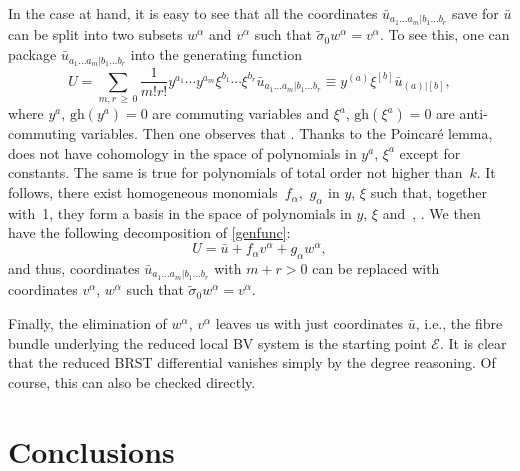 \documentclass[10pt,a4paper]{amsart}
\numberwithin{equation}{section}
\theoremstyle{definition}
\renewcommand{\tilde}{\widetilde}
\newcommand{\gh}[1]{\mathrm{gh}(#1)}
\renewcommand{\geq}{\,{\geqslant}\,}
\def\cE{\mathcal{E}}
\begin{document}
In the case at hand, it is easy to see that all the coordinates $\bar{u}_{a_1\dots a_m|b_1\dots b_r}$ save for $\bar{u}$ can be split into two subsets $w^\alpha$ and $v^\alpha$ such that $\tilde\sigma_0 w^\alpha=v^\alpha$. To see this, one can package $\bar{u}_{a_1\dots a_m|b_1\dots b_r}$ into the generating function
\begin{equation}\label{genfunc}
 U=\sum_{m,r\geq0}\frac{1}{m!r!}y^{a_1}\cdots y^{a_m}\xi^{b_1}\cdots\xi^{b_r}\bar{u}_{a_1\dots a_m|b_1\dots b_r}\equiv y^{(a)}\xi^{[b]}\bar{u}_{(a)|[b]},
\end{equation}
where $y^a$, $\gh{y^a}=0$ are commuting variables and $\xi^a$, $\gh{\xi^a}=0$ are anti-commuting variables. Then one observes that \smash{$\tilde\sigma_0 U=\xi^a\frac{\partial}{\partial y^a} U$}.
Thanks to the Poincar\'{e} lemma,  does not have cohomology in the space of polynomials in $y^a$, $\xi^a$ except for constants. The same is true for polynomials of total order not higher than~$k$. It follows, there exist homogeneous monomials~$f_\alpha$,~$g_\alpha$ in $y$, $\xi$ such that, together with~1, they form a basis in the space of polynomials in $y$, $\xi$ and~, . We then have the following decomposition of \eqref{genfunc}:
\begin{equation*}
 U=\bar{u}+f_{\alpha}v^{\alpha}+g_{\alpha}w^{\alpha},
\end{equation*}
 and thus, coordinates $\bar{u}_{a_1\dots a_m|b_1\dots b_r}$ with $m+r>0$ can be replaced with coordinates $v^{\alpha}$, $w^{\alpha}$ such that $\tilde\sigma_0 w^{\alpha}=v^{\alpha}$.

Finally, the elimination of $w^\alpha$, $v^\alpha$ leaves us with just coordinates $\bar{u}$, i.e., the fibre bundle
underlying the reduced local BV system is the starting point $\cE$. It is clear that the reduced BRST differential vanishes simply by the degree reasoning. Of course, this can also be checked directly.

\section{Conclusions}
\end{document}
